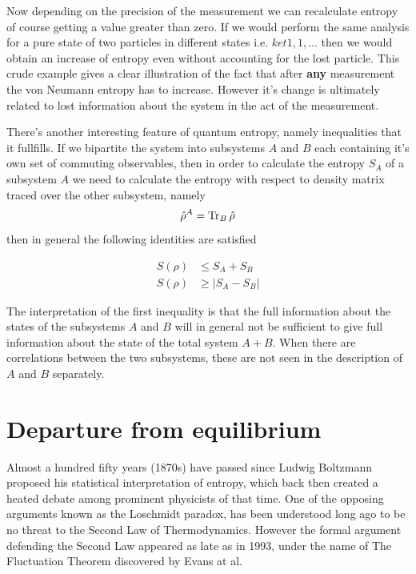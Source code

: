 \documentclass[a4paper,12pt,nofootinbib]{article}
\begin{document}
Now depending on the precision of the measurement we can recalculate entropy of course getting a value greater than zero. If we would perform the same analysis for a pure state of two particles in different states i.e. $ket{1,1,...}$ then we would obtain an increase of entropy even without accounting for the lost particle.
This crude example gives a clear illustration of the fact that after \textbf{any} measurement the von Neumann entropy has to increase. However it's change is ultimately related to lost information about the system in the act of the measurement.

There's another interesting feature of quantum entropy, namely inequalities that it fullfills.
If we bipartite the system into subsystems $A$ and $B$ each containing it's own set of commuting observables, then in order to calculate the entropy $S_A$ of a subsystem $A$ we need to calculate the entropy with respect to density matrix traced over the other subsystem, namely
\begin{equation}
  \hat{\rho}^A = \Tr_B \hat{\rho} 
\end{equation}
then in general the following identities are satisfied

\begin{equation}
\begin{aligned}
	S(\rho) &\leq S_A + S_B	\\
	S(\rho) &\geq \left| S_A - S_B \right|
\end{aligned}
\end{equation}

The interpretation of the first inequality is that the full information about the states of the subsystems $A$ and $B$ will in general not be sufficient to give full information about the state of the total system $A+B$. When there are correlations between the two subsystems, these are not seen in the description of $A$ and $B$ separately.

\section{Departure from equilibrium}

Almost a hundred fifty years (1870s) have passed since Ludwig Boltzmann proposed his statistical interpretation of entropy, which back then created a heated debate among prominent physicists of that time. 
One of the opposing arguments known as the Loschmidt paradox, has been understood long ago to be no threat to the Second Law of Thermodynamics. However the formal argument defending the Second Law appeared as late as in 1993, under the name of The Fluctuation Theorem discovered by Evans at al.
\end{document}
